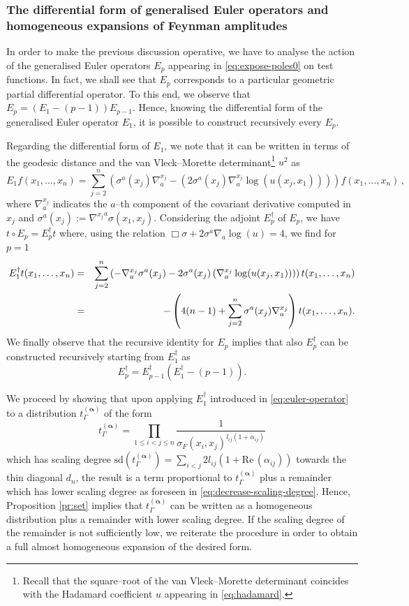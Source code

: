 \documentclass[a4paper,10pt,twoside]{article}
\numberwithin{equation}{section}
\newcounter{and}
\def\Ree{\mathrm{Re}\,}
\def\sd{\mathrm{sd}}
\def\balpha{{\boldsymbol{\alpha}}}
\theoremstyle{plain}
\theoremstyle{definition}
\begin{document}
\subsubsection{The differential form of generalised Euler operators and homogeneous expansions of Feynman amplitudes}
\label{sec:differentialEuler}

In order to make the previous discussion operative, we have to analyse the action of the generalised Euler operators $E_p$ appearing in \eqref{eq:expose-poles0} on test functions. In fact, we shall see that $E_p$ corresponds to a particular geometric partial differential operator. To this end, we observe that $E_p = (E_1-(p-1)) E_{p-1}$. Hence, knowing the differential form of the generalised Euler operator $E_1$, it is possible to construct recursively every $E_p$.

Regarding the differential form of $E_1$, we note that it can be written in terms of the geodesic distance and the van Vleck--Morette determinant\footnote{Recall that the square--root of the van Vleck--Morette determinant coincides with the Hadamard coefficient $u$ appearing in \eqref{eq:hadamard}.} $u^2$  as 
\[
E_1 f(x_1, \dots, x_n) = \sum_{j=2}^n \left(\sigma^a(x_j) \nabla^{x_j}_a  - \left(2  \sigma^a(x_j) \nabla^{x_j}_a  \log (u(x_j,x_1))\right)\right) f(x_1, \dots, x_n)\,,
\]
where $\nabla^{x_j}_a$ indicates the $a$--th component of the covariant derivative computed in $x_j$ and 
$\sigma^a(x_j) := {\nabla^{x_j}}^a\sigma(x_1,x_j)$.
Considering the adjoint $E^\dagger_p$ of $E_p$, we have $t\circ E_p = E^\dagger_p t$ where, using the relation $\Box \sigma + 2\sigma^a\nabla_a \log (u) = 4$, we find for $p=1$
%
\begin{eqnarray}
E_1^\dagger  t(x_1,\dots,x_n)     
&=&  \sum_{j=2}^n \left(- \nabla^{x_j}_a \sigma^a(x_j)    - 2 \sigma^a(x_j) \left(\nabla^{x_j}_a \log (u(x_j,x_1)) \right)\right) t(x_1,\dots,x_n) \notag \\
&=& -\left( 4(n-1) +  \sum_{j=2}^n \sigma^a(x_j) \nabla^{x_j}_a   \right)t(x_1,\dots,x_n).
\label{eq:euler-operator}
\end{eqnarray}
%
We finally observe that the recursive identity for $E_p$ implies that also $E^\dagger_p$ can be constructed recursively starting from $E^\dagger_1$ as 
\[
E_p^\dagger =  E_{p-1}^\dagger (E_1^\dagger-(p-1)).
\]

We proceed by showing that upon applying $E^\dagger_1$ introduced in  \eqref{eq:euler-operator} to a distribution $t_\Gamma^{(\balpha)}$ of the form
\[
t_\Gamma^{(\balpha)}=\prod_{1\leq i < j \leq n } \frac{1}{\sigma_F(x_i,x_j)^{l_{ij}(1+ \alpha_{ij})}}
\]
which has scaling degree $\sd(t_\Gamma^{(\balpha)}) = \sum_{i<j} 2 l_{ij}(1+ \Ree(\alpha_{ij}))$ towards the thin diagonal $d_n$, the result is a term proportional to $t_\Gamma^{(\balpha)}$ plus a remainder which has lower scaling degree as foreseen in \eqref{eq:decrease-scaling-degree}. Hence, Proposition \ref{pr:set} implies that $t_\Gamma^{(\balpha)}$ can be written as a homogeneous distribution plus a remainder with lower scaling degree. If the scaling degree of the remainder is not sufficiently low, we reiterate the procedure in order to obtain a full almost homogeneous expansion of the desired form.
\end{document}
